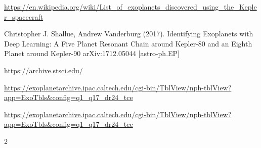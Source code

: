 \documentclass[twoside]{article}
\begin{document}
\begin{multicols}{2}
\begin{thebibliography}{99}
\url{https://en.wikipedia.org/wiki/List_of_exoplanets_discovered_using_the_Kepler_spacecraft}

Christopher J. Shallue, Andrew Vanderburg (2017).
\newblock Identifying Exoplanets with Deep Learning: A Five Planet Resonant Chain around Kepler-80 and an Eighth Planet around Kepler-90
\newblock arXiv:1712.05044 [astro-ph.EP]

\url{https://archive.stsci.edu/}

\url{https://exoplanetarchive.ipac.caltech.edu/cgi-bin/TblView/nph-tblView?app=ExoTbls&config=q1_q17_dr24_tce}

\url{https://exoplanetarchive.ipac.caltech.edu/cgi-bin/TblView/nph-tblView?app=ExoTbls&config=q1_q17_dr24_tce}
 
\end{thebibliography}


\end{multicols}{2}
\end{document}
